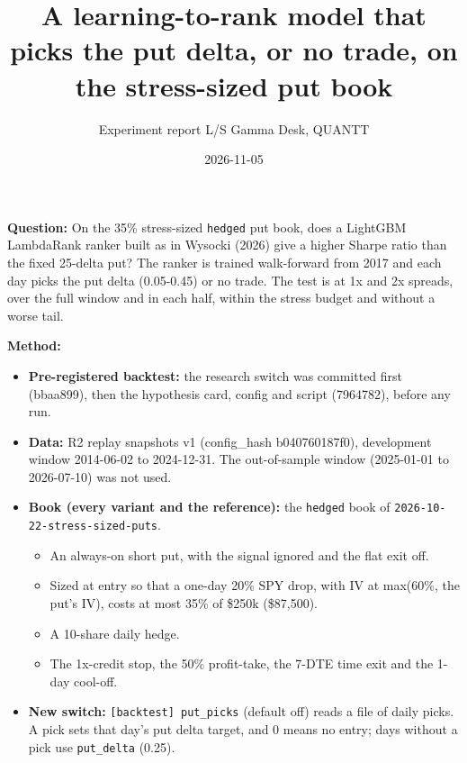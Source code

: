 \documentclass{article}
\title{A learning-to-rank model that picks the put delta, or no trade, on the stress-sized put book}
\author{Experiment report \textperiodcentered{} L/S Gamma Desk, QUANTT}
\date{2026-11-05}
\begin{document}
\maketitle

\textbf{Question:} On the 35\% stress-sized \texttt{hedged} put book, does a LightGBM LambdaRank ranker built as in Wysocki (2026) give a higher Sharpe ratio than the fixed 25-delta put? The ranker is trained walk-forward from 2017 and each day picks the put delta (0.05-0.45) or no trade. The test is at 1x and 2x spreads, over the full window and in each half, within the stress budget and without a worse tail.

\textbf{Method:}

\begin{itemize}

\item \textbf{Pre-registered backtest:} the research switch was committed first (bbaa899), then the hypothesis card, config and script (7964782), before any run.

\item \textbf{Data:} R2 replay snapshots v1 (config\_hash b040760187f0), development window 2014-06-02 to 2024-12-31. The out-of-sample window (2025-01-01 to 2026-07-10) was not used.

\item \textbf{Book (every variant and the reference):} the \texttt{hedged} book of \texttt{2026-\allowbreak{}10-\allowbreak{}22-\allowbreak{}stress-\allowbreak{}sized-\allowbreak{}puts}.

\begin{itemize}

\item An always-on short put, with the signal ignored and the flat exit off.

\item Sized at entry so that a one-day 20\% SPY drop, with IV at max(60\%, the put's IV), costs at most 35\% of \$250k (\$87,500).

\item A 10-share daily hedge.

\item The 1x-credit stop, the 50\% profit-take, the 7-DTE time exit and the 1-day cool-off.

\end{itemize}

\item \textbf{New switch:} \texttt{[backtest] put\_\allowbreak{}picks} (default off) reads a file of daily picks. A pick sets that day's put delta target, and 0 means no entry; days without a pick use \texttt{put\_\allowbreak{}delta} (0.25).


\end{itemize}
\end{document}
